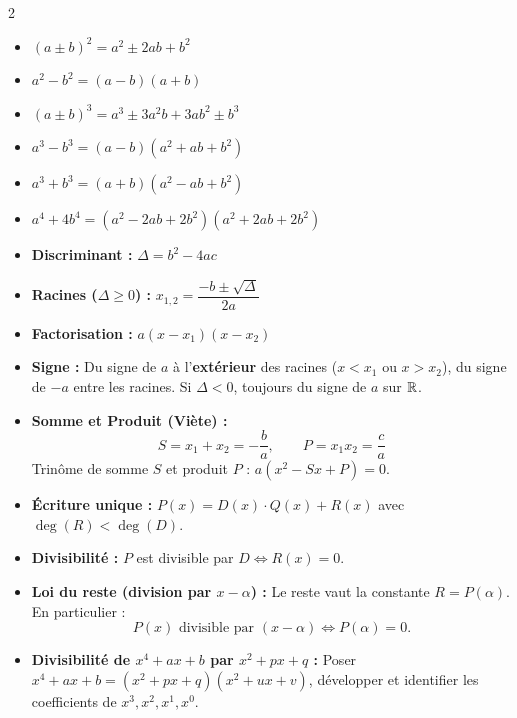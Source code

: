{\fontsize{9.5pt}{11.5pt}\selectfont
\setlength{\columnsep}{18pt}
\begin{multicols}{2}

\begin{itemize}[leftmargin=1.2em, itemsep=1.5pt, topsep=2pt]
    \item $(a \pm b)^2 = a^2 \pm 2ab + b^2$
    \item $a^2 - b^2 = (a - b)(a + b)$
    \item $(a \pm b)^3 = a^3 \pm 3a^2b + 3ab^2 \pm b^3$
    \item $a^3 - b^3 = (a - b)(a^2 + ab + b^2)$
    \item $a^3 + b^3 = (a + b)(a^2 - ab + b^2)$
    \item $a^4 + 4b^4 = (a^2 - 2ab + 2b^2)(a^2 + 2ab + 2b^2)$
\end{itemize}

\vspace{3pt}
\begin{itemize}[leftmargin=1.2em, itemsep=1.5pt, topsep=2pt]
    \item \textbf{Discriminant :} $\Delta = b^2 - 4ac$
    \item \textbf{Racines ($\Delta \ge 0$) :} $x_{1,2} = \dfrac{-b \pm \sqrt{\Delta}}{2a}$
    \item \textbf{Factorisation :} $a(x - x_1)(x - x_2)$
    \item \textbf{Signe :} Du signe de $a$ à l'\textbf{extérieur} des racines ($x < x_1$ ou $x > x_2$), du signe de $-a$ entre les racines. Si $\Delta < 0$, toujours du signe de $a$ sur $\mathbb{R}$.
    \item \textbf{Somme et Produit (Viète) :}
    \[
        S = x_1 + x_2 = -\frac{b}{a}, \qquad P = x_1 x_2 = \frac{c}{a}
    \]
    Trinôme de somme $S$ et produit $P$ : $a(x^2 - Sx + P) = 0$.
\end{itemize}

\vspace{3pt}
\begin{itemize}[leftmargin=1.2em, itemsep=1.5pt, topsep=2pt]
    \item \textbf{Écriture unique :} $P(x) = D(x)\cdot Q(x) + R(x)$ avec $\deg(R) < \deg(D)$.
    \item \textbf{Divisibilité :} $P$ est divisible par $D \iff R(x) = 0$.
    \item \textbf{Loi du reste (division par $x - \alpha$) :} Le reste vaut la constante $R = P(\alpha)$. En particulier :
    \[
        P(x) \text{ divisible par } (x - \alpha) \iff P(\alpha) = 0.
    \]
    \item \textbf{Divisibilité de $x^4 + ax + b$ par $x^2 + px + q$ :} Poser $x^4 + ax + b = (x^2 + px + q)(x^2 + ux + v)$, développer et identifier les coefficients de $x^3, x^2, x^1, x^0$.
\end{itemize}


\end{multicols}}
